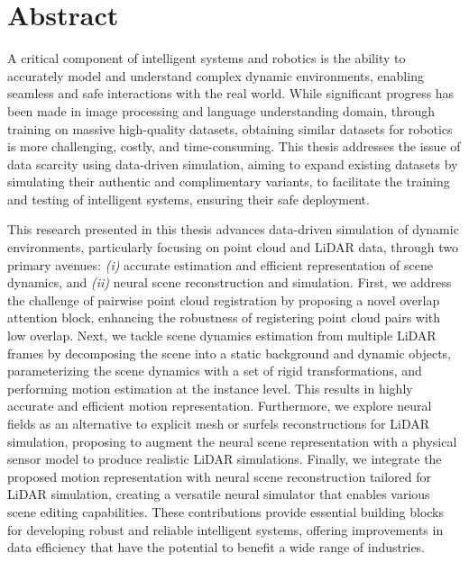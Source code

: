 
\chapter*{Abstract}
\label{chap:abstract}
A critical component of intelligent systems and robotics is the ability to accurately model and understand complex dynamic environments, enabling seamless and safe interactions with the real world. While significant progress has been made in image processing and language understanding domain, through training on massive high-quality datasets, obtaining similar datasets for robotics is more challenging, costly, and time-consuming. This thesis addresses the issue of data scarcity using data-driven simulation, aiming to expand existing datasets by simulating their authentic and complimentary variants, to facilitate the training and testing of intelligent systems, ensuring their safe deployment.

This research presented in this thesis advances data-driven simulation of dynamic environments, particularly focusing on point cloud and LiDAR data, through two primary avenues: \textit{(i)} accurate estimation and efficient representation of scene dynamics, and \textit{(ii)} neural scene reconstruction and simulation. First, we address the challenge of pairwise point cloud registration by proposing a novel overlap attention block, enhancing the robustness of registering point cloud pairs with low overlap. Next, we tackle scene dynamics estimation from multiple LiDAR frames by decomposing the scene into a static background and dynamic objects, parameterizing the scene dynamics with a set of rigid transformations, and performing motion estimation at the instance level. This results in highly accurate and efficient motion representation. Furthermore, we explore neural fields as an alternative to explicit mesh or surfels reconstructions for LiDAR simulation, proposing to augment the neural scene representation with a physical sensor model to produce realistic LiDAR simulations. Finally, we integrate the proposed motion representation with neural scene reconstruction tailored for LiDAR simulation, creating a versatile neural simulator that enables various scene editing capabilities. These contributions provide essential building blocks for developing robust and reliable intelligent systems, offering improvements in data efficiency that have the potential to benefit a wide range of industries.


